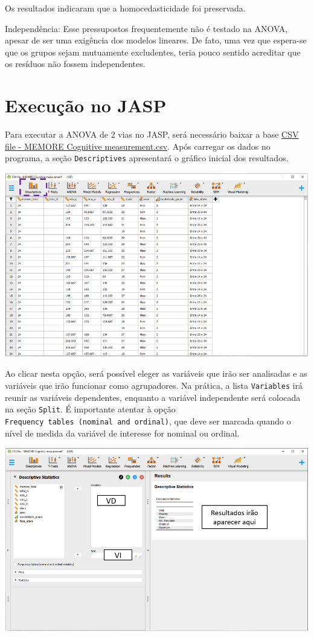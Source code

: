 \documentclass[
]{book}
\begin{document}
Os resultados indicaram que a homocedasticidade foi preservada.

Independência: Esse pressupostos frequentemente não é testado na ANOVA, apesar de ser uma exigência dos modelos lineares. De fato, uma vez que espera-se que os grupos sejam mutuamente excludentes, teria pouco sentido acreditar que os resíduos não fossem independentes.

\hypertarget{execuuxe7uxe3o-no-jasp-7}{%
\section{Execução no JASP}\label{execuuxe7uxe3o-no-jasp-7}}

Para executar a ANOVA de 2 vias no JASP, será necessário baixar a base \href{https://osf.io/4hdc2/}{CSV file - MEMORE Cognitive measurement.csv}. Após carregar os dados no programa, a seção \texttt{Descriptives} apresentará o gráfico inicial dos resultados.

\includegraphics{./img/cap_anova_two_way_descriptives.png}

Ao clicar nesta opção, será possível eleger as variáveis que irão ser analisadas e as variáveis que irão funcionar como agrupadores. Na prática, a lista \texttt{Variables} irá reunir as variáveis dependentes, enquanto a variável independente será colocada na seção \texttt{Split}. É importante atentar à opção \texttt{Frequency\ tables\ (nominal\ and\ ordinal)}, que deve ser marcada quando o nível de medida da variável de interesse for nominal ou ordinal.

\includegraphics{./img/cap_anova_two_way_descriptives2.png}
\end{document}
